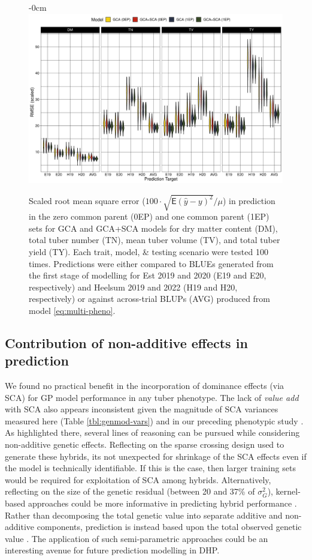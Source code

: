\begin{figure}[H]
\begin{adjustwidth}{-\extralength}{0cm}
\centering
\includegraphics[width=15.5cm]{figs_03/fig-rmsd-1.pdf}
\end{adjustwidth}
\caption{\label{fig:rmsd}Scaled root mean square error (\(100\cdot\sqrt{\mathsf{E}(\hat{y}- y)^2}/\mu\)) in prediction in the zero common parent (0EP) and one common parent (1EP) sets for GCA and GCA+SCA models for dry matter content (DM), total tuber number (TN), mean tuber volume (TV), and total tuber yield (TY). Each trait, model, \& testing scenario were tested 100 times. Predictions were either compared to BLUEs generated from the first stage of modelling for Est 2019 and 2020 (E19 and E20, respectively) and Heelsum 2019 and 2022 (H19 and H20, respectively) or against across-trial BLUPs (AVG) produced from model \ref{eq:multi-pheno}.}
\end{figure}

\subsection{Contribution of non-additive effects in prediction}

We found no practical benefit in the incorporation of dominance effects (via SCA) for GP model performance in any tuber phenotype. The lack of \emph{value add} with SCA also appears inconsistent given the magnitude of SCA variances measured here (Table \ref{tbl:genmod-vars}) and in our preceding phenotypic study \cite{Adams2022}. As highlighted there, several lines of reasoning can be pursued while considering non-additive genetic effects. Reflecting on the sparse crossing design used to generate these hybrids, its not unexpected for shrinkage of the SCA effects even if the model is technically identifiable. If this is the case, then larger training sets would be required for exploitation of SCA among hybrids. Alternatively, reflecting on the size of the genetic residual (between 20 and 37\% of \(\sigma_G^2\)), kernel-based approaches could be more informative in predicting hybrid performance \cite{Gianola2008, Crossa2019a}. Rather than decomposing the total genetic value into separate additive and non-additive components, prediction is instead based upon the total observed genetic value \cite{Bernardo2020}. The application of such semi-parametric approaches could be an interesting avenue for future prediction modelling in DHP.

